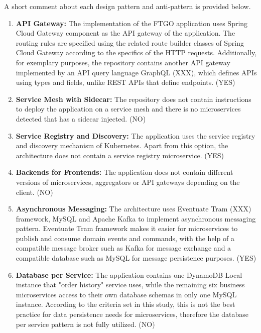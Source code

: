 \documentclass{Configuration_Files/PoliMi3i_thesis}
\begin{document}
A short comment about each design pattern and anti-pattern is provided below.

\begin{enumerate}
    \item \textbf{API Gateway:} The implementation of the FTGO application uses Spring Cloud Gateway component as the API gateway of the application.
    The routing rules are specified using the related route builder classes of Spring Cloud Gateway according to the specifics of the HTTP requests.
    Additionally, for exemplary purposes, the repository contains another API gateway implemented by an API query language GraphQL (XXX), which defines APIs using types and fields, unlike REST APIs that define endpoints. (YES)
    
    \item \textbf{Service Mesh with Sidecar:} The repository does not contain instructions to deploy the application on a service mesh and there is no microservices detected that has a sidecar injected. (NO)
    
    \item \textbf{Service Registry and Discovery:} The application uses the service registry and discovery mechanism of Kubernetes.
    Apart from this option, the architecture does not contain a service registry microservice. (YES)
    
    \item \textbf{Backends for Frontends:} The application does not contain different versions of microservices, aggregators or API gateways depending on the client. (NO)
    
    \item \textbf{Asynchronous Messaging:} The architecture uses Eventuate Tram (XXX) framework, MySQL and Apache Kafka to implement asynchronous messaging pattern.
    Eventuate Tram framework makes it easier for microservices to publish and consume domain events and commands, with the help of a compatible message broker such as Kafka for message exchange and a compatible database such as MySQL for message persistence purposes. (YES)
    
    \item \textbf{Database per Service:} The application contains one DynamoDB Local instance that "order history" service uses, while the remaining six business microservices access to their own database schemas in only one MySQL instance.
    According to the criteria set in this study, this is not the best practice for data persistence needs for microservices, therefore the database per service pattern is not fully utilized. (NO)
    

\end{enumerate}
\end{document}
